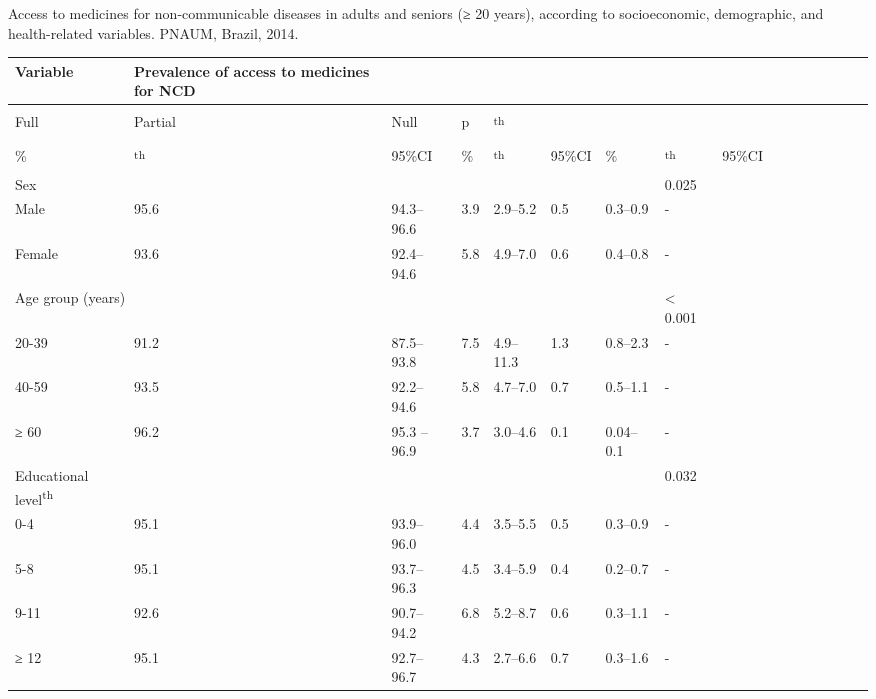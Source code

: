 \documentclass{article}
\begin{document}
\label{Table 1}
\caption{Access to medicines for non-communicable diseases in adults and seniors
(≥ 20 years), according to socioeconomic, demographic, and health-related
variables. PNAUM, Brazil, 2014.}
\begin{tabular}{| l | l || || l | l | l | l | l || || l | l | l | l | l | l | l
| l | l |}
\hline
Variable & Prevalence of access to medicines for NCD\\ \hline
\\ \hline
Full & Partial & Null & p & \textsuperscript{th}
\\ \hline
\\ \hline
\% & \textsuperscript{th}
& 95\%CI & \% & \textsuperscript{th}
& 95\%CI & \% & \textsuperscript{th}
& 95\%CI\\ \hline
Sex
& \multicolumn{6}{l}{}
& 0.025
\\ \hline

Male
& 95.6
& 94.3–96.6
& 3.9
& 2.9–5.2
& 0.5
& 0.3–0.9
& -
\\ \hline

Female
& 93.6
& 92.4–94.6
& 5.8
& 4.9–7.0
& 0.6
& 0.4–0.8
& -
\\ \hline

\multicolumn{7}{l}{Age group (years)}
& < 0.001
\\ \hline

20-39
& 91.2
& 87.5–93.8
& 7.5
& 4.9–11.3
& 1.3
& 0.8–2.3
& -
\\ \hline

40-59
& 93.5
& 92.2–94.6
& 5.8
& 4.7–7.0
& 0.7
& 0.5–1.1
& -
\\ \hline

≥ 60
& 96.2
& 95.3 –96.9
& 3.7
& 3.0–4.6
& 0.1
& 0.04–0.1
& -
\\ \hline

Educational level\textsuperscript{th}

& \multicolumn{2}{l}{}
& \multicolumn{2}{l}{}
& \multicolumn{2}{l}{}
& 0.032
\\ \hline

0-4
& 95.1
& 93.9–96.0
& 4.4
& 3.5–5.5
& 0.5
& 0.3–0.9
& -
\\ \hline

5-8
& 95.1
& 93.7–96.3
& 4.5
& 3.4–5.9
& 0.4
& 0.2–0.7
& -
\\ \hline

9-11
& 92.6
& 90.7–94.2
& 6.8
& 5.2–8.7
& 0.6
& 0.3–1.1
& -
\\ \hline

≥ 12
& 95.1
& 92.7–96.7
& 4.3
& 2.7–6.6
& 0.7
& 0.3–1.6
& -
\\ \hline


\end{tabular}
\end{document}
